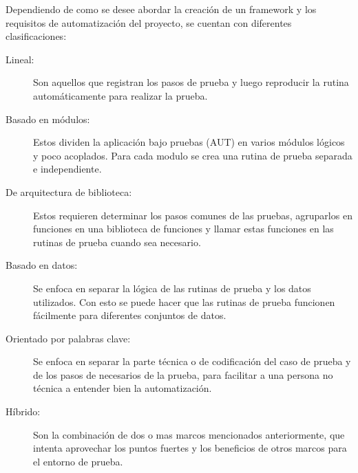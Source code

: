Dependiendo de como se desee abordar la creación de un framework y los
requisitos de automatización del proyecto, se cuentan con diferentes
clasificaciones:

\begin{description}
    \item [Lineal:] Son aquellos que registran los pasos de prueba y luego
        reproducir la rutina automáticamente para realizar la prueba.
    \item [Basado en módulos:] Estos dividen la aplicación bajo pruebas (AUT) en
        varios módulos lógicos y poco acoplados. Para cada modulo se crea una
        rutina de prueba separada e independiente.
    \item [De arquitectura de biblioteca:] Estos requieren determinar los pasos
        comunes de las pruebas, agruparlos en funciones en una biblioteca de
        funciones y llamar estas funciones en las rutinas de prueba cuando sea
        necesario.
    \item [Basado en datos:] Se enfoca en separar la lógica de las rutinas de
        prueba y los datos utilizados. Con esto se puede hacer que las rutinas
        de prueba funcionen fácilmente para diferentes conjuntos de datos.
    \item [Orientado por palabras clave:] Se enfoca en separar la parte técnica
        o de codificación del caso de prueba y de los pasos de necesarios de la
        prueba, para facilitar a una persona no técnica a entender bien la
        automatización.
    \item [Híbrido:] Son la combinación de dos o mas marcos mencionados
        anteriormente, que intenta aprovechar los puntos fuertes y los
        beneficios de otros marcos para el entorno de prueba.
\end{description}


